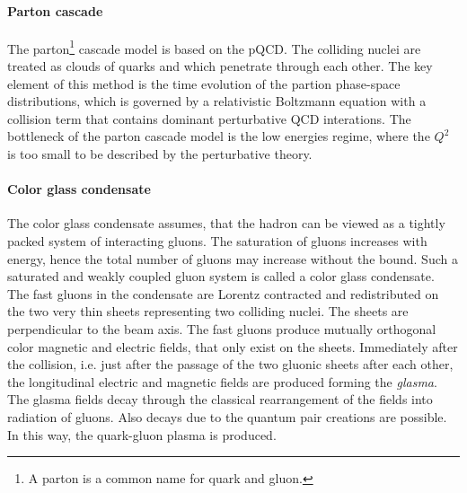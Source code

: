       \paragraph{Parton cascade}
      The parton\footnote{A parton is a common name for quark and gluon.} cascade model is based on the pQCD.
      The colliding nuclei are treated as clouds of quarks and which penetrate through each other.
      The key element of this method is the time evolution of the partion phase-space distributions, which is governed by a relativistic Boltzmann equation with a collision term that contains dominant perturbative QCD interations.
      The bottleneck of the parton cascade model is the low energies regime, where the $Q^2$ is too small to be described by the perturbative theory.
      \paragraph{Color glass condensate}
      The color glass condensate assumes, that the hadron can be viewed as a tightly packed system of interacting gluons.
      The saturation of gluons increases with energy, hence the total number of gluons may increase without the bound.
      Such a saturated and weakly coupled gluon system is called a color glass condensate.
      The fast gluons in the condensate are Lorentz contracted and redistributed on the two very thin sheets representing two colliding nuclei.
      The sheets are perpendicular to the beam axis.
      The fast gluons produce mutually orthogonal color magnetic and electric fields, that only exist on the sheets.
      Immediately after the collision, i.e. just after the passage of the two gluonic sheets after each other, the longitudinal electric and magnetic fields are produced forming the \textit{glasma}.
      The glasma fields decay through the classical rearrangement of the fields into radiation of gluons.
      Also decays due to the quantum pair creations are possible.
      In this way, the quark-gluon plasma is produced.
      \\

